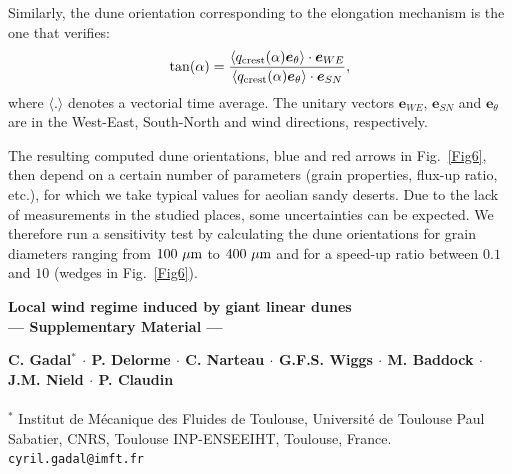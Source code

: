 Similarly, the dune orientation corresponding to the elongation mechanism is the one that verifies:
%
\begin{equation}
\tan(\alpha) = \frac{\langle q_{\textup{crest}}(\alpha) \boldsymbol{e}_{\theta}\rangle \cdot \boldsymbol{e}_{WE} }{ \langle q_{\textup{crest}}(\alpha) \boldsymbol{e}_{\theta} \rangle \cdot \boldsymbol{e}_{SN}},
\end{equation}
%
where $\langle.\rangle$ denotes a vectorial time average. The unitary vectors $\boldsymbol{e}_{WE}$, $\boldsymbol{e}_{SN}$ and $\boldsymbol{e}_{\theta}$ are in the West-East, South-North and wind directions, respectively.

The resulting computed dune orientations, blue and red arrows in Fig.~\ref{Fig6}, then depend on a certain number of parameters (grain properties, flux-up ratio, etc.), for which we take typical values for aeolian sandy deserts. Due to the lack of measurements in the studied places, some uncertainties can be expected. We therefore run a sensitivity test by calculating the dune orientations for grain diameters ranging from $100~\mu\textup{m}$ to $400~\mu\textup{m}$ and for a speed-up ratio between $0.1$ and $10$ (wedges in Fig.~\ref{Fig6}).


\clearpage





\newpage

\renewcommand{\thefigure}{S\arabic{figure}}
\setcounter{figure}{0}

\begin{center}
\textbf{\large
Local wind regime induced by giant linear dunes \\
--- Supplementary Material ---
}
\end{center}

\noindent
\textbf{C. Gadal$^{*}$ $\cdot$ P. Delorme $\cdot$ C. Narteau $\cdot$ G.F.S. Wiggs $\cdot$ M. Baddock $\cdot$ J.M. Nield $\cdot$ P. Claudin}
\\ \\
$^{*}$ Institut de M\'ecanique des Fluides de Toulouse, Universit\'e de Toulouse Paul Sabatier, CNRS, Toulouse INP-ENSEEIHT, Toulouse, France.\\
\texttt{cyril.gadal@imft.fr}


